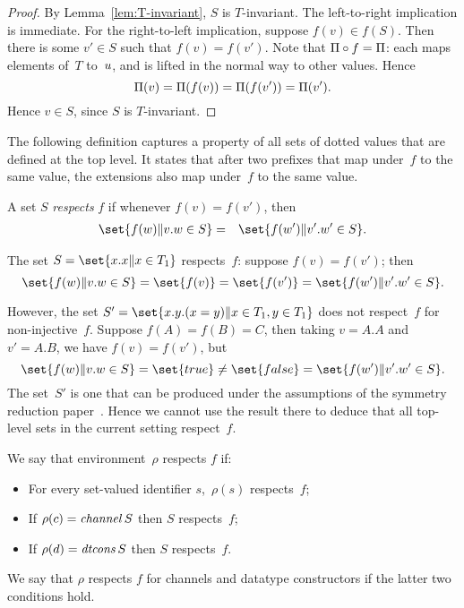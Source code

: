 \begin{proof}
By Lemma~\ref{lem:T-invariant}, $S$ is $T$-invariant.  The left-to-right
implication is immediate.  For the right-to-left implication, suppose $f(v)
\in f(S)$.  Then there is some $v' \in S$ such that $f(v) = f(v')$.  Note that
$\Pi \circ f = \Pi$: each maps elements of~$T$ to~$u$, and is lifted
in the normal way to other values.  Hence 
\[
\Pi(v) = \Pi(f(v)) = \Pi(f(v')) = \Pi(v').
\]
Hence $v \in S$, since $S$ is $T$-invariant.
\end{proof}


The following definition captures a property of all sets of dotted values that
are defined at the top level.  It states that after two prefixes that map
under~$f$ to the same value, the extensions also map under~$f$ to the same
value. 
%
\begin{definition}
A set $S$ \emph{respects} $f$ if whenever $f(v) = f(v')$, then
\begin{eqnarray*}
\set{f(w) \| v.w \in S} & = & \set{f(w') \| v'.w' \in S}.
\end{eqnarray*}
\end{definition}

\begin{note}
The set $S = \set{x.x \| x \in T_1}$ respects~$f$: suppose $f(v) = f(v')$;
then
\[
\set{f(w) \| v.w \in S} = \set{f(v)} = \set{f(v')} =
   \set{f(w') \| v'.w' \in S}.
\]

However, the set $S' = \set{ x.y.(x=y) \| x \in T_1, y \in T_1}$ does not
respect~$f$ for non-injective~$f$.  Suppose $f(A) = f(B) = C$, then taking $v
= A.A$ and $v' = A.B$, we have $f(v) = f(v')$, but
\[
\set{f(w) \| v.w \in S} = \set{true} \ne \set{false} = 
  \set{f(w') \| v'.w' \in S}.
\]
The set~$S'$ is one that can be produced under the assumptions of the symmetry
reduction paper~\cite{symmetry}.  Hence we cannot use the result there to
deduce that all top-level sets in the current setting respect~$f$. 
\end{note}

\begin{definition}
We say that environment~$\rho$ respects $f$ if:
\begin{itemize}
\item For every set-valued identifier $s$,\, $\rho(s)$ respects~$f$;

\item If $\rho(c) = \mathop{\it channel} S$ then $S$ respects~$f$;

\item If $\rho(d) = \mathop{\it dtcons} S$ then $S$ respects~$f$.
\end{itemize}

We say that $\rho$ respects $f$ for channels and datatype constructors if the
latter two conditions hold.
\end{definition}

